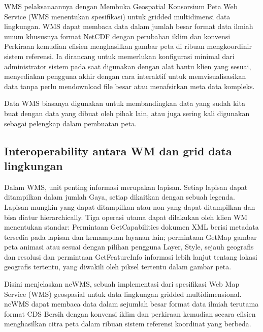    WMS pelaksanaannya dengan Membuka Geospatial Konsorsium Peta Web Service (WMS menentukan spesifikasi) untuk gridded multidimensi data lingkungan. WMS dapat membaca data dalam jumlah besar format data ilmiah umum khususnya format NetCDF dengan perubahan iklim dan konvensi Perkiraan kemudian efisien menghasilkan gambar peta di ribuan mengkoordinir sistem referensi. Ia dirancang untuk memerlukan konfigurasi minimal dari administrator sistem pada saat digunakan dengan alat bantu klien yang sesuai, menyediakan pengguna akhir dengan cara interaktif untuk memvisualisasikan data tanpa perlu mendownload file besar atau menafsirkan meta data kompleks. 

Data WMS biasanya digunakan untuk membandingkan data yang sudah kita buat dengan data yang dibuat oleh pihak lain, atau juga sering kali
digunakan sebagai pelengkap dalam pembuatan peta.

\subsection{Interoperability antara WM dan grid data lingkungan}

Dalam WMS, unit penting informasi merupakan lapisan. Setiap lapisan dapat ditampilkan dalam jumlah Gaya, setiap dikaitkan dengan sebuah
legenda. Lapisan mungkin yang dapat ditampilkan atau non-yang dapat ditampilkan dan bisa diatur hierarchically. Tiga operasi utama dapat
dilakukan oleh klien WM menentukan standar: Permintaan GetCapabilities dokumen XML berisi metadata tersedia pada lapisan dan kemampuan
layanan lain; permintaan GetMap gambar peta animasi atau sesuai dengan pilihan pengguna Layer, Style, sejauh geografis dan resolusi dan
permintaan GetFeatureInfo informasi lebih lanjut tentang lokasi geografis tertentu, yang diwakili oleh piksel tertentu dalam gambar
peta.

Disini menjelaskan ncWMS, sebuah implementasi dari spesifikasi Web Map Service (WMS) geospasial untuk data lingkungan gridded
multidimensional. ncWMS dapat membaca data dalam sejumlah besar format data ilmiah terutama format CDS Bersih dengan konvensi iklim 
dan perkiraan kemudian secara efisien menghasilkan citra peta dalam ribuan sistem referensi koordinat yang berbeda.

